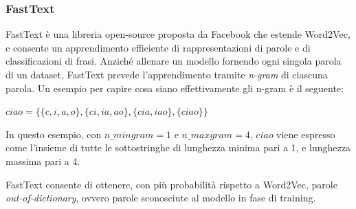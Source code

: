 \subsubsection{FastText}

FastText è una libreria open-source proposta da Facebook che estende Word2Vec, e consente un apprendimento efficiente di rappresentazioni di parole e di classificazioni di frasi.
Anziché allenare un modello fornendo ogni singola parola di un dataset, FastText prevede l'apprendimento tramite \textit{n-gram} di ciascuna parola.
Un esempio per capire cosa siano effettivamente gli n-gram è il seguente:

\begin{center}
    $ciao = \{\{c, i, a, o\},\{ci, ia, ao\}, \{cia, iao\}, \{ciao\}\}$
\end{center}

In questo esempio, con $n\_mingram = 1$ e $n\_maxgram = 4$, $ciao$ viene espresso come l'insieme di tutte le sottostringhe di lunghezza minima pari a 1, e lunghezza massima pari a 4.


FastText consente di ottenere, con più probabilità rispetto a Word2Vec, parole \emph{out-of-dictionary}, ovvero parole sconosciute al modello in fase di training.

